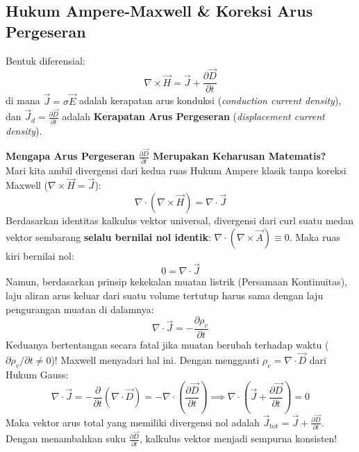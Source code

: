 \documentclass[11pt,a4paper]{article}
\theoremstyle{definition}
\begin{document}
\subsection{Hukum Ampere-Maxwell \& Koreksi Arus Pergeseran}
Bentuk diferensial:
\begin{equation}
    \nabla \times \vec{H} = \vec{J} + \frac{\partial \vec{D}}{\partial t}
    \label{eq:ampere_maxwell}
\end{equation}
di mana $\vec{J} = \sigma \vec{E}$ adalah kerapatan arus konduksi (\textit{conduction current density}), dan $\vec{J}_d = \frac{\partial \vec{D}}{\partial t}$ adalah \textbf{Kerapatan Arus Pergeseran} (\textit{displacement current density}).

\begin{tipbox}
\textbf{Mengapa Arus Pergeseran $\frac{\partial \vec{D}}{\partial t}$ Merupakan Keharusan Matematis?}\\
Mari kita ambil divergensi dari kedua ruas Hukum Ampere klasik tanpa koreksi Maxwell ($\nabla \times \vec{H} = \vec{J}$):
\begin{equation*}
    \nabla \cdot (\nabla \times \vec{H}) = \nabla \cdot \vec{J}
\end{equation*}
Berdasarkan identitas kalkulus vektor universal, divergensi dari curl suatu medan vektor sembarang \textbf{selalu bernilai nol identik}: $\nabla \cdot (\nabla \times \vec{A}) \equiv 0$. Maka ruas kiri bernilai nol:
\begin{equation*}
    0 = \nabla \cdot \vec{J}
\end{equation*}
Namun, berdasarkan prinsip kekekalan muatan listrik (Persamaan Kontinuitas), laju aliran arus keluar dari suatu volume tertutup harus sama dengan laju pengurangan muatan di dalamnya:
\begin{equation*}
    \nabla \cdot \vec{J} = -\frac{\partial \rho_v}{\partial t}
\end{equation*}
Keduanya bertentangan secara fatal jika muatan berubah terhadap waktu ($\partial\rho_v/\partial t \neq 0$)! Maxwell menyadari hal ini. Dengan mengganti $\rho_v = \nabla \cdot \vec{D}$ dari Hukum Gauss:
\begin{equation*}
    \nabla \cdot \vec{J} = -\frac{\partial}{\partial t}(\nabla \cdot \vec{D}) = -\nabla \cdot \left(\frac{\partial \vec{D}}{\partial t}\right) \implies \nabla \cdot \left( \vec{J} + \frac{\partial \vec{D}}{\partial t} \right) = 0
\end{equation*}
Maka vektor arus total yang memiliki divergensi nol adalah $\vec{J}_{\text{tot}} = \vec{J} + \frac{\partial \vec{D}}{\partial t}$. Dengan menambahkan suku $\frac{\partial \vec{D}}{\partial t}$, kalkulus vektor menjadi sempurna konsisten!
\end{tipbox}
\end{document}
